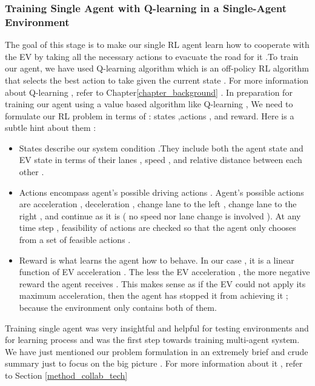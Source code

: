 \subsubsection{Training Single Agent with Q-learning in a Single-Agent Environment}
\label{single_agent_collab} 
The goal of this stage is to make our single RL agent learn how to cooperate with the EV by taking all the necessary actions to evacuate the road for it .To train our agent, we have used Q-learning algorithm which is an off-policy RL algorithm that selects the best action to take given the current state  . For more information about Q-learning , refer to Chapter\ref{chapter_background} . 
In preparation for training our agent using a value based algorithm like Q-learning , We need to formulate our RL problem in terms of : states ,actions , and reward.
Here is a subtle hint about them : 
\begin{itemize}
    \item States describe our system condition .They include both the agent state and EV state in terms of their lanes , speed , and relative distance between each other .
     \item Actions encompass agent's possible driving actions . Agent's possible actions are acceleration , deceleration , change lane to the left , change lane to the right , and continue as it is ( no speed nor lane change is involved ). At any time step , feasibility of actions are checked so that the agent only chooses from a set of feasible actions .
     \item Reward is what learns the agent how to behave. In our case , it is a linear function of EV acceleration . The less the EV acceleration , the more negative reward the agent receives . This makes sense as if the EV could not apply its maximum acceleration, then the agent has stopped it from achieving it ; because the environment only contains both of them.
     
\end{itemize}
Training single agent was very insightful and  helpful for testing environments and for learning process and was the first step towards training multi-agent system. We have just mentioned our problem formulation in an extremely brief and crude summary just to focus on the big picture . For more information about it , refer to Section \ref{method_collab_tech} 





